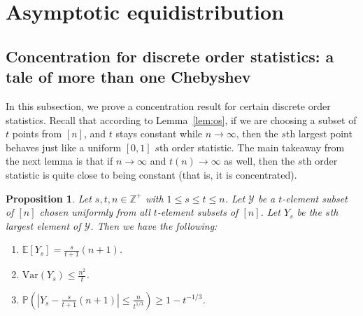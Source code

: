 \documentclass{amsart}
\newtheorem{proposition}[theorem]{Proposition}
\theoremstyle{definition}
\newcommand{\Var}{\mathrm{Var}}
\begin{document}




\section{Asymptotic equidistribution}\label{sec:equi}
\subsection{Concentration for discrete order statistics: a tale of more than one Chebyshev}
    In this subsection, we prove a concentration result for certain discrete order statistics. Recall that according to Lemma~\ref{lem:os}, if we are choosing a subset of $t$ points from $[n]$, and $t$ stays constant while $n\to \infty$, then the $s$th largest point behaves just like a uniform $[0,1]$ $s$th order statistic. The main takeaway from the next lemma is that if $n\to \infty$ and $t(n)\to \infty$ as well, then the $s$th order statistic is quite close to being constant (that is, it is concentrated).

\begin{proposition}\label{prop:conc}
Let $s,t,n\in \mathbb{Z}^+$ with $1\leq s\leq t\leq n$. Let $\mathcal{Y}$ be a $t$-element subset of $[n]$ chosen uniformly from all $t$-element subsets of $[n]$. Let $Y_s$ be the $s$th largest element of $\mathcal{Y}$. Then we have the following:
\begin{enumerate}[label=(\arabic*)]
    \item $\mathbb{E}[Y_s]=\frac{s}{t+1}(n+1)$.
    \item $\Var(Y_s)\leq \frac{n^2}{t}$.
    \item $\mathbb{P}(|Y_s-\frac{s}{t+1}(n+1)|\leq \frac{n}{t^{1/3}})\geq 1-t^{-1/3}$.
\end{enumerate}
\end{proposition}
\end{document}
